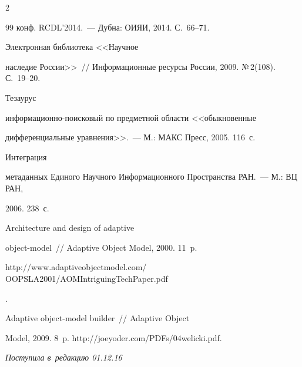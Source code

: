 \begin{multicols}{2}
{{\begin{thebibliography}{99}
конф. RCDL'2014.~--- Дубна: ОИЯИ, 2014. С.~66--71.


 Электронная библиотека <<Научное 

наследие России>>~// Информационные ресурсы России, 2009. №\,2(108). С.~19--20.


 Тезаурус  

ин\-фор\-ма\-ци\-он\-но-по\-ис\-ко\-вый по предметной области <<обыкновенные 

дифференциальные уравнения>>.~--- М.: МАКС Пресс, 2005. 116~с.


 Интеграция 

метаданных Единого Научного Информационного Пространства РАН.~--- М.: ВЦ РАН, 

2006.  238~с.


 Architecture and design of adaptive  

object-model~// Adaptive Object Model, 2000. 11~p. {\sf 

http://www.adaptiveobjectmodel.com/ OOPSLA2001/AOMIntriguingTechPaper.pdf}.


 Adaptive object-model builder~// Adaptive Object 

Model, 2009. 8~p. {\sf http://joeyoder.com/PDFs/04welicki.pdf}.

 \end{thebibliography}



 }

 }



\end{multicols}



\vspace*{-3pt}



\hfill{\small\textit{Поступила в~редакцию 01.12.16}}



\vspace*{8pt}



